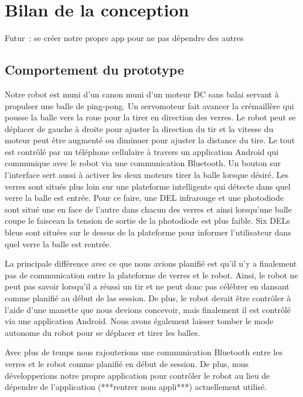 \section{Bilan de la conception}


Futur : se créer notre propre app pour ne pas dépendre des autres

\subsection{Comportement du prototype}

Notre robot est muni d’un canon muni d’un moteur DC sans balai servant à propulser une balle de ping-pong.
Un servomoteur fait avancer la crémaillère qui pousse la balle vers la roue pour la tirer en direction des verres.
Le robot peut se déplacer de gauche à droite pour ajuster la direction du tir et la vitesse du moteur peut être augmenté ou diminuer pour ajuster la distance du tire.
Le tout est contrôlé par un téléphone cellulaire à travers un application Android qui communique avec le robot via une communication Bluetooth.
Un bouton sur l’interface sert aussi à activer les deux moteurs tirer la balle lorsque désiré.
Les verres sont situés plus loin sur une plateforme intelligente qui détecte dans quel verre la balle est entrée.
Pour ce faire, une DEL infrarouge et une photodiode sont situé une en face de l’autre dans chacun des verres et ainsi lorsqu’une balle coupe le faisceau la tension de sortie de la photodiode est plus faible.
Six DELs bleus sont situées sur le dessus de la plateforme pour informer l’utilisateur dans quel verre la balle est rentrée.


La principale différence avec ce que nous avions planifié est qu’il n’y a finalement pas de communication entre la plateforme de verres et le robot.
Ainsi, le robot ne peut pas savoir lorsqu’il a réussi un tir et ne peut donc pas célébrer en dansant comme planifié au début de las session.
De plus, le robot devait être contrôler à l’aide d’une manette que nous devions concevoir, mais finalement il est contrôlé via une application Android.
Nous avons également laisser tomber le mode autonome du robot pour se déplacer et tirer les balles.




Avec plus de temps nous rajouterions une communication Bluetooth entre les verres et le robot comme planifié en début de session.
De plus, nous développerions notre propre application pour contrôler le robot au lieu de dépendre de l’application (***rentrer nom appli***) actuellement utilisé.

